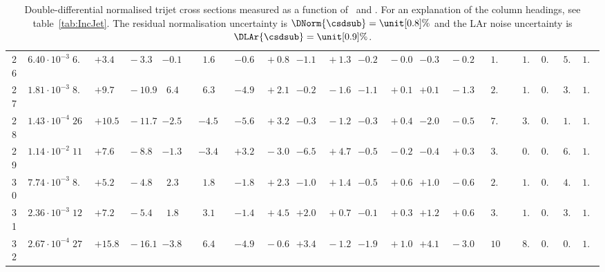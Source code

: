 \documentclass[12pt]{article}
\begin{document}
\begin{table}
\begin{tabular}{ccrr@{\hskip0pt}rrc@{\hskip0pt}r@{\hskip0pt}c@{\hskip0pt}r@{\hskip0pt}rr@{\hskip0pt}rr@{\hskip0pt}rr@{\hskip0pt}rr@{\hskip0pt}r@{\hskip0pt}r@{\hskip0pt}c|rr|r}
26 &$6.40 \cdot 10^{-3}$ &$ 6.7$  & ${+3.4~}$&${~-3.3}$ & $-0.1$  & &$ 1.6$&&${-0.6~}$&${~+0.8}$ & ${-1.1~}$&${~+1.3}$ & ${-0.2~}$&${~-0.0}$ & ${-0.3~}$&${~-0.2}$ & &$ 1.7$&&$ 1.3$  & $0.78$  & $ 5.6$  & $1.04$   \\ 
27 &$1.81 \cdot 10^{-3}$ &$ 8.6$  & ${+9.7~}$&${~-10.9}$ & $ 6.4$  & &$ 6.3$&&${-4.9~}$&${~+2.1}$ & ${-0.2~}$&${~-1.6}$ & ${-1.1~}$&${~+0.1}$ & ${+0.1~}$&${~-1.3}$ & &$ 2.1$&&$ 1.2$  & $0.84$  & $ 3.6$  & $1.04$   \\ 
28 &$1.43 \cdot 10^{-4}$ &$26.7$  & ${+10.5~}$&${~-11.7}$ & $-2.5$  & &$-4.5$&&${-5.6~}$&${~+3.2}$ & ${-0.3~}$&${~-1.2}$ & ${-0.3~}$&${~+0.4}$ & ${-2.0~}$&${~-0.5}$ & &$ 7.5$&&$ 3.9$  & $0.83$  & $ 1.5$  & $1.08$   \\ 
29 &$1.14 \cdot 10^{-2}$ &$11.0$  & ${+7.6~}$&${~-8.8}$ & $-1.3$  & &$-3.4$&&${+3.2~}$&${~-3.0}$ & ${-6.5~}$&${~+4.7}$ & ${-0.5~}$&${~-0.2}$ & ${-0.4~}$&${~+0.3}$ & &$ 3.0$&&$ 0.7$  & $0.73$  & $ 6.1$  & $1.04$   \\ 
30 &$7.74 \cdot 10^{-3}$ &$ 8.8$  & ${+5.2~}$&${~-4.8}$ & $ 2.3$  & &$ 1.8$&&${-1.8~}$&${~+2.3}$ & ${-1.0~}$&${~+1.4}$ & ${-0.5~}$&${~+0.6}$ & ${+1.0~}$&${~-0.6}$ & &$ 2.2$&&$ 1.4$  & $0.78$  & $ 4.8$  & $1.03$   \\ 
31 &$2.36 \cdot 10^{-3}$ &$12.0$  & ${+7.2~}$&${~-5.4}$ & $ 1.8$  & &$ 3.1$&&${-1.4~}$&${~+4.5}$ & ${+2.0~}$&${~+0.7}$ & ${-0.1~}$&${~+0.3}$ & ${+1.2~}$&${~+0.6}$ & &$ 3.0$&&$ 1.6$  & $0.83$  & $ 3.2$  & $1.04$   \\ 
32 &$2.67 \cdot 10^{-4}$ &$27.5$  & ${+15.8~}$&${~-16.1}$ & $-3.8$  & &$ 6.4$&&${-4.9~}$&${~-0.6}$ & ${+3.4~}$&${~-1.2}$ & ${-1.9~}$&${~+1.0}$ & ${+4.1~}$&${~-3.0}$ & &$10.0$&&$ 8.3$  & $0.84$  & $ 0.8$  & $1.06$   \\ 
\hline
\hline
\end{tabular}

    \caption{
      Double-differential normalised trijet cross sections measured as a function of \Qsq\ and \meanpttri. 
      For an explanation of the column headings, see table~\ref{tab:IncJet}.
      The residual normalisation uncertainty is $\DNorm{\csdsub} =\unit[0.8]{\%}$
      and the LAr noise uncertainty is $\DLAr{\csdsub} = \unit[0.9]{\%}$.
  }
  \label{tab:NormTrijet}
\end{table}
\end{document}
